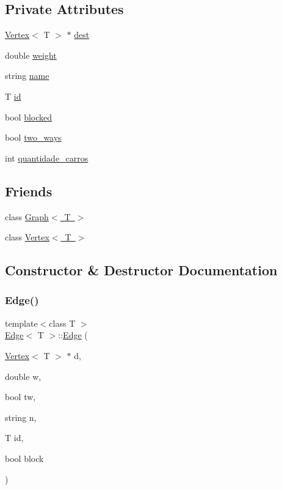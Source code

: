 \subsection*{Private Attributes}
\begin{DoxyCompactItemize}
\item 
\mbox{\hyperlink{class_vertex}{Vertex}}$<$ T $>$ $\ast$ \mbox{\hyperlink{class_edge_ae4d65678b91bd9d814af4720ad87cd0c}{dest}}
\item 
double \mbox{\hyperlink{class_edge_af188b57b604f0d65e2da48733bd76426}{weight}}
\item 
string \mbox{\hyperlink{class_edge_a68c87e8024711c383a9bbcb2793e4d0c}{name}}
\item 
T \mbox{\hyperlink{class_edge_af64ff5794c079dcb6af0986cd404185c}{id}}
\item 
bool \mbox{\hyperlink{class_edge_ad6ef308f0a89198b588a98055b8edc33}{blocked}}
\item 
bool \mbox{\hyperlink{class_edge_a555b4858038c4cc6b0e064fb2db5c397}{two\+\_\+ways}}
\item 
int \mbox{\hyperlink{class_edge_a1b5317f59441ca01b3b09a37d0ee57b5}{quantidade\+\_\+carros}}
\end{DoxyCompactItemize}
\subsection*{Friends}
\begin{DoxyCompactItemize}
\item 
class \mbox{\hyperlink{class_edge_aefa9b76cd57411c5354e5620dc2d84dd}{Graph$<$ T $>$}}
\item 
class \mbox{\hyperlink{class_edge_a2e120a12dec663fa334633b4f26cbed8}{Vertex$<$ T $>$}}
\end{DoxyCompactItemize}


\subsection{Constructor \& Destructor Documentation}
\mbox{\label{class_edge_af91ae535825f84ebca33b11859350442}} 
\subsubsection{\texorpdfstring{Edge()}{Edge()}}
{\footnotesize\ttfamily template$<$class T $>$ \\
\mbox{\hyperlink{class_edge}{Edge}}$<$ T $>$\+::\mbox{\hyperlink{class_edge}{Edge}} (\begin{DoxyParamCaption}\item[{\mbox{\hyperlink{class_vertex}{Vertex}}$<$ T $>$ $\ast$}]{d,  }\item[{double}]{w,  }\item[{bool}]{tw,  }\item[{string}]{n,  }\item[{T}]{id,  }\item[{bool}]{block }\end{DoxyParamCaption})}

